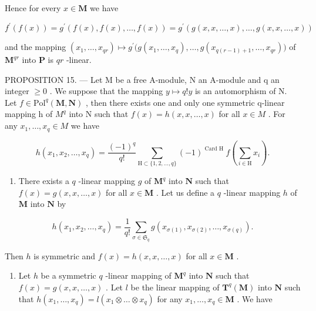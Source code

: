 Hence for every \(x \in \mathbf{M}\) we have

\[
f ^ {\prime} (f (x)) = g ^ {\prime} (f (x), f (x), \dots , f (x)) = g ^ {\prime} (g (x, x, \dots , x), \dots , g (x, x, \dots , x))
\]

and the mapping \((x_{1},\ldots ,x_{qr})\mapsto g^{\prime}\big(g(x_{1},\dots,x_{q}),\dots,g(x_{q(r - 1) + 1},\dots,x_{qr})\big)\) of \(\mathbf{M}^{qr}\) into \(\mathbf{P}\) is \(qr\) -linear.

PROPOSITION 15. --- Let M be a free A-module, N an A-module and q an integer \(\geqslant0\) . We suppose that the mapping \(y\mapsto q!y\) is an automorphism of N. Let \(f\in\mathrm{Pol}^{q}(\mathbf{M},\mathbf{N})\) , then there exists one and only one symmetric q-linear mapping h of \(M^{q}\) into N such that \(f(x)=h(x,x,\ldots,x)\) for all \(x\in M\) . For any \(x_{1},\ldots,x_{q}\in M\) we have

\[
h \left(x _ {1}, x _ {2}, \dots , x _ {q}\right) = \frac {(- 1) ^ {q}}{q !} \sum_ {\mathrm{H} \subset \{1, 2, \dots , q \}} (- 1) ^ {\text { Card   H }} f \left(\sum_ {i \in \mathrm{H}} x _ {i}\right).\tag{16}
\]

\begin{enumerate}
\def\labelenumi{\alph{enumi})}
\tightlist
\item
  There exists a \(q\) -linear mapping \(g\) of \(\mathbf{M}^q\) into \(\mathbf{N}\) such that \(f(x) = g(x, x, \ldots, x)\) for all \(x \in \mathbf{M}\) . Let us define a \(q\) -linear mapping \(h\) of \(\mathbf{M}\) into \(\mathbf{N}\) by
\end{enumerate}

\[
h \left(x _ {1}, x _ {2}, \dots , x _ {q}\right) = \frac {1}{q !} \sum_ {\sigma \in \mathfrak {S} _ {q}} g \left(x _ {\sigma (1)}, x _ {\sigma (2)}, \dots , x _ {\sigma (q)}\right).
\]

Then \(h\) is symmetric and \(f(x) = h(x, x, \ldots, x)\) for all \(x \in \mathbf{M}\) .

\begin{enumerate}
\def\labelenumi{\alph{enumi})}
\setcounter{enumi}{1}
\tightlist
\item
  Let \(h\) be a symmetric \(q\) -linear mapping of \(\mathbf{M}^q\) into \(\mathbf{N}\) such that \(f(x) = g(x, x, \ldots, x)\) . Let \(l\) be the linear mapping of \(\mathbf{T}^q(\mathbf{M})\) into \(\mathbf{N}\) such that \(h(x_1, \ldots, x_q) = l(x_1 \otimes \ldots \otimes x_q)\) for any \(x_1, \ldots, x_q \in \mathbf{M}\) . We have
\end{enumerate}

